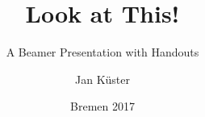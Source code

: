 %
%
%	
%	
%

\title[Look at this!]{Look at This!}
\subtitle{A Beamer Presentation with Handouts}
\author[Jan K\"uster]{Jan K\"uster}
\date[BREMEN 2017] %
{Bremen 2017}
\subject{Presenting Content}